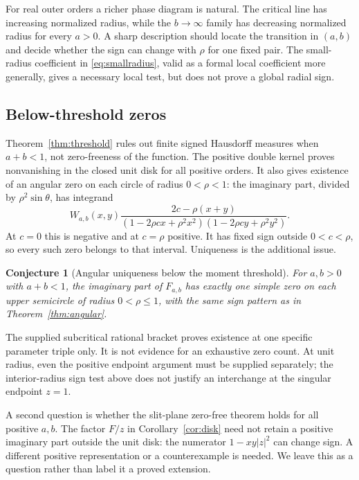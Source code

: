 \documentclass[11pt]{article}
\numberwithin{equation}{section}
\newtheorem{conjecture}[theorem]{Conjecture}
\theoremstyle{definition}\newtheorem{definition}[theorem]{Definition}
\theoremstyle{remark}\newtheorem{remark}[theorem]{Remark}
\begin{document}
For real outer orders a richer phase diagram is natural. The critical
line has increasing normalized radius, while the $b\to\infty$ family
has decreasing normalized radius for every $a>0$. A sharp description
should locate the transition in $(a,b)$ and decide whether the sign
can change with $\rho$ for one fixed pair. The small-radius coefficient
in \eqref{eq:smallradius}, valid as a formal local coefficient more
generally, gives a necessary local test, but does not prove a global
radial sign.

\subsection{Below-threshold zeros}
Theorem~\ref{thm:threshold} rules out finite signed Hausdorff measures
when $a+b<1$, not zero-freeness of the function. The positive double
kernel proves nonvanishing in the closed unit disk for all positive
orders. It also gives existence of an angular zero on each circle
of radius $0<\rho<1$: the imaginary part, divided by
$\rho^2\sin\theta$, has integrand
\[
 W_{a,b}(x,y)
 \frac{2c-\rho(x+y)}
 {(1-2\rho cx+\rho^2x^2)(1-2\rho cy+\rho^2y^2)}.
\]
At $c=0$ this is negative and at $c=\rho$ positive. It has fixed
sign outside $0<c<\rho$, so every such zero belongs to that interval.
Uniqueness is the additional issue.

\begin{conjecture}[Angular uniqueness below the moment threshold]
\label{conj:subcritical}
For $a,b>0$ with $a+b<1$, the imaginary part of $F_{a,b}$ has exactly
one simple zero on each upper semicircle of radius $0<\rho\le1$,
with the same sign pattern as in Theorem~\ref{thm:angular}.
\end{conjecture}
The supplied subcritical rational bracket proves existence at one
specific parameter triple only. It is not evidence for an exhaustive
zero count. At unit radius, even the positive endpoint argument must
be supplied separately; the interior-radius sign test above does not
justify an interchange at the singular endpoint $z=1$.

A second question is whether the slit-plane zero-free theorem holds
for all positive $a,b$. The factor $F/z$ in
Corollary~\ref{cor:disk} need not retain a positive imaginary part
outside the unit disk: the numerator $1-xy|z|^2$ can change sign.
A different positive representation or a counterexample is needed.
We leave this as a question rather than label it a proved extension.
\end{document}
